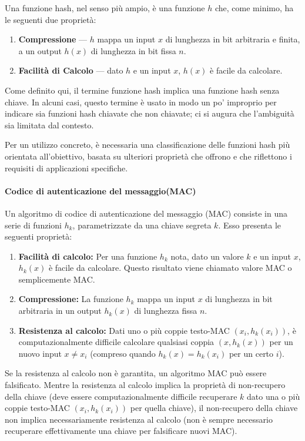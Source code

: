 \documentclass{article}
\theoremstyle{definition}
\begin{document}
Una funzione hash, nel senso più ampio, è una funzione \( h \) che, come minimo, ha le seguenti due proprietà:
\begin{enumerate}
    \item \textbf{Compressione} --- \( h \) mappa un input \( x \) di lunghezza in bit arbitraria e finita, a un output \( h(x) \) di lunghezza in bit fissa \( n \).
    \item \textbf{Facilità di Calcolo} --- dato \( h \) e un input \( x \), \( h(x) \) è facile da calcolare.
\end{enumerate}

Come definito qui, il termine funzione hash implica una funzione hash senza chiave. In alcuni casi, questo termine è usato in modo un po' improprio per indicare sia funzioni hash chiavate che non chiavate; ci si augura che l'ambiguità sia limitata dal contesto.

Per un utilizzo concreto, è necessaria una classificazione delle funzioni hash più orientata all'obiettivo, basata su ulteriori proprietà che offrono e che riflettono i requisiti di applicazioni specifiche. 

\paragraph{Codice di autenticazione del messaggio(MAC)}
Un algoritmo di codice di autenticazione del messaggio (MAC) consiste in una serie di funzioni \(h_k\), parametrizzate da una chiave segreta \(k\). Esso presenta le seguenti proprietà:
\begin{enumerate}
    \item \textbf{Facilità di calcolo:} Per una funzione \(h_k\) nota, dato un valore \(k\) e un input \(x\), \(h_k(x)\) è facile da calcolare. Questo risultato viene chiamato valore MAC o semplicemente MAC.
    \item \textbf{Compressione:} La funzione \(h_k\) mappa un input \(x\) di lunghezza in bit arbitraria in un output \(h_k(x)\) di lunghezza fissa \(n\).
    \item \textbf{Resistenza al calcolo:} Dati uno o più coppie testo-MAC \((x_i, h_k(x_i))\), è computazionalmente difficile calcolare qualsiasi coppia \((x, h_k(x))\) per un nuovo input \(x \neq x_i\) (compreso quando \(h_k(x) = h_k(x_i)\) per un certo \(i\)).
\end{enumerate}
Se la resistenza al calcolo non è garantita, un algoritmo MAC può essere falsificato. Mentre la resistenza al calcolo implica la proprietà di non-recupero della chiave (deve essere computazionalmente difficile recuperare \(k\) dato una o più coppie testo-MAC \((x_i, h_k(x_i))\) per quella chiave), il non-recupero della chiave non implica necessariamente resistenza al calcolo (non è sempre necessario recuperare effettivamente una chiave per falsificare nuovi MAC).
\end{document}
